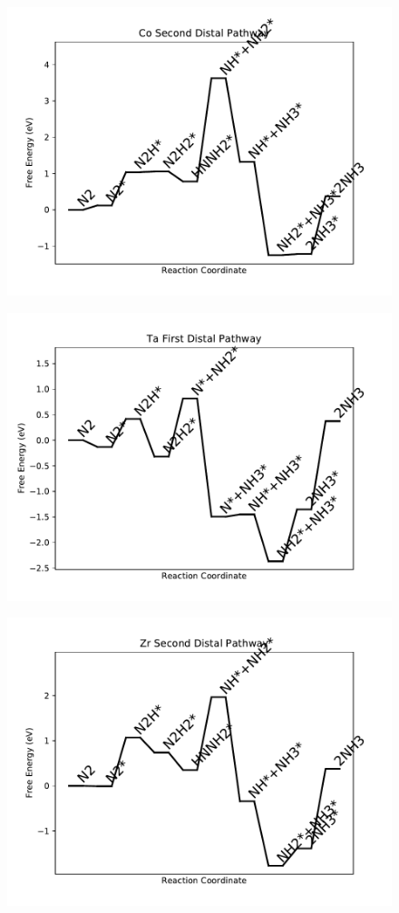 \begin{figure}
\centering
\includegraphics[width=0.8\linewidth]{data/plots/Co_distal_2.pdf}
\end{figure}

\begin{figure}
\centering
\includegraphics[width=0.8\linewidth]{data/plots/Ta_distal_1.pdf}
\end{figure}

\begin{figure}
\centering
\includegraphics[width=0.8\linewidth]{data/plots/Zr_distal_2.pdf}
\end{figure}

